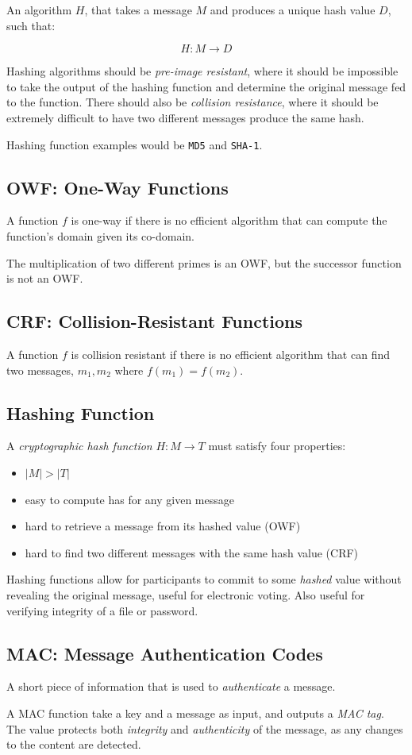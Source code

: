\documentclass{article}
\begin{document}
An algorithm $H$, that takes a message $M$ and produces a unique hash value $D$, such that:

\[ H : M \rightarrow D\]

Hashing algorithms should be \textit{pre-image resistant}, where it should be impossible to take the output of the hashing function and determine the original message fed to the function. There should also be \textit{collision resistance}, where it should be extremely difficult to have two different messages produce the same hash.

Hashing function examples would be \texttt{MD5} and \texttt{SHA-1}.

\subsection{OWF: One-Way Functions}

A function $f$ is one-way if there is no efficient algorithm that can compute the function's domain given its co-domain.

The multiplication of two different primes is an OWF, but the successor function is not an OWF.

\subsection{CRF: Collision-Resistant Functions}

A function $f$ is collision resistant if there is no efficient algorithm that can find two messages, $m_1, m_2$ where $f(m_1) = f(m_2)$.

\subsection{Hashing Function}

A \textit{cryptographic hash function} $H : M \rightarrow T$ must satisfy four properties:

\begin{itemize}
\item
  $|M| > |T|$
\item
  easy to compute has for any given message
\item
  hard to retrieve a message from its hashed value (OWF)
\item
  hard to find two different messages with the same hash value (CRF)  
\end{itemize}

Hashing functions allow for participants to commit to some \textit{hashed} value without revealing the original message, useful for electronic voting. Also useful for verifying integrity of a file or password.

\subsection{MAC: Message Authentication Codes}

A short piece of information that is used to \textit{authenticate} a message.

A MAC function take a key and a message as input, and outputs a \textit{MAC tag}. The value protects both \textit{integrity} and \textit{authenticity} of the message, as any changes to the content are detected.
\end{document}

